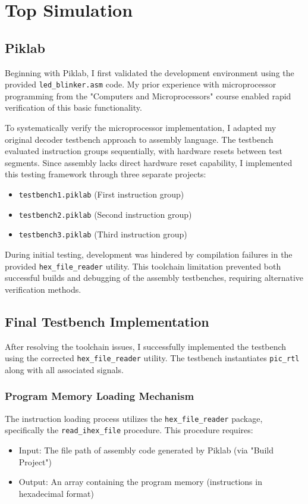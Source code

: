 \chapter{Top Simulation}\label{chapter2}

\section{Piklab}

Beginning with Piklab, I first validated the development environment using the provided \texttt{led\_blinker.asm} code. My prior experience with microprocessor programming from the "Computers and Microprocessors" course enabled rapid verification of this basic functionality. 

To systematically verify the microprocessor implementation, I adapted my original decoder testbench approach to assembly language. The testbench evaluated instruction groups sequentially, with hardware resets between test segments. Since assembly lacks direct hardware reset capability, I implemented this testing framework through three separate projects:

\begin{itemize}
    \item \texttt{testbench1.piklab} (First instruction group)
    \item \texttt{testbench2.piklab} (Second instruction group)
    \item \texttt{testbench3.piklab} (Third instruction group)
\end{itemize}

During initial testing, development was hindered by compilation failures in the provided \texttt{hex\_file\_reader} utility. This toolchain limitation prevented both successful builds and debugging of the assembly testbenches, requiring alternative verification methods.


\section{Final Testbench Implementation}

After resolving the toolchain issues, I successfully implemented the testbench using the corrected \texttt{hex\_file\_reader} utility. The testbench instantiates \texttt{pic\_rtl} along with all associated signals.

\subsection{Program Memory Loading Mechanism}
The instruction loading process utilizes the \texttt{hex\_file\_reader} package, specifically the \texttt{read\_ihex\_file} procedure. This procedure requires:
\begin{itemize}
    \item Input: The file path of assembly code generated by Piklab (via "Build Project")
    \item Output: An array containing the program memory (instructions in hexadecimal format)
\end{itemize}

